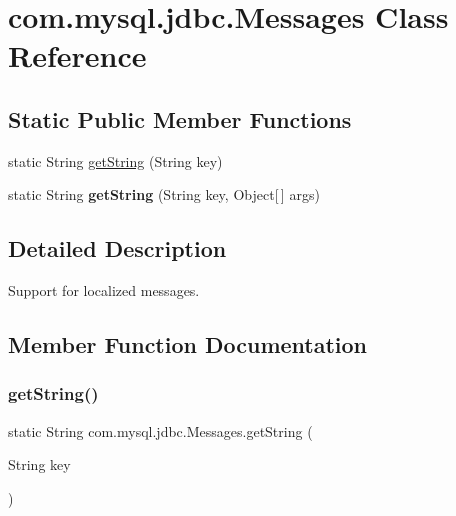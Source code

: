 \hypertarget{classcom_1_1mysql_1_1jdbc_1_1_messages}{}\section{com.\+mysql.\+jdbc.\+Messages Class Reference}
\label{classcom_1_1mysql_1_1jdbc_1_1_messages}
\subsection*{Static Public Member Functions}
\begin{DoxyCompactItemize}
\item 
static String \mbox{\hyperlink{classcom_1_1mysql_1_1jdbc_1_1_messages_ad6d3160126b07ad0d56d97250bed8412}{get\+String}} (String key)
\item 
\mbox{\label{classcom_1_1mysql_1_1jdbc_1_1_messages_a5c816b463f36e76e3682be77df281993}} 
static String {\bfseries get\+String} (String key, Object\mbox{[}$\,$\mbox{]} args)
\end{DoxyCompactItemize}


\subsection{Detailed Description}
Support for localized messages. 

\subsection{Member Function Documentation}
\mbox{\label{classcom_1_1mysql_1_1jdbc_1_1_messages_ad6d3160126b07ad0d56d97250bed8412}} 
\subsubsection{\texorpdfstring{get\+String()}{getString()}}
{\footnotesize\ttfamily static String com.\+mysql.\+jdbc.\+Messages.\+get\+String (\begin{DoxyParamCaption}\item[{String}]{key }\end{DoxyParamCaption})\hspace{0.3cm}{\ttfamily [static]}}

